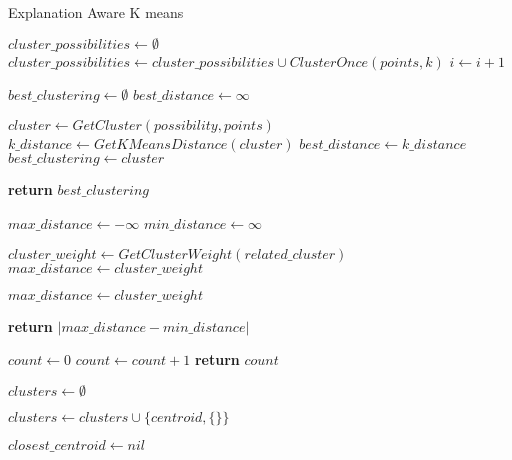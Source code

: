 \begin{algorithm}
\caption{Explanation Aware K means}\label{alg:kmeans}
\begin{algorithmic}[1]
    \State $cluster\_possibilities \gets \emptyset$
      \State $cluster\_possibilities \gets cluster\_possibilities \cup ClusterOnce(points, k)$
      \State $i \gets i + 1$
    \EndFor

    \State $best\_clustering \gets \emptyset$
    \State $best\_distance \gets \infty$

      \State $cluster \gets GetCluster(possibility, points)$
      \State $k\_distance \gets GetKMeansDistance(cluster)$
        \State $best\_distance \gets k\_distance$
        \State $best\_clustering \gets cluster$
      \EndIf
    \EndFor

    \State \textbf{return} $best\_clustering$
\EndProcedure

    \State $max\_distance \gets -\infty$
    \State $min\_distance \gets \infty$

    \end{algorithmic}
    \end{algorithm}
    \begin{algorithm}
    \begin{algorithmic} [1]
      \State $cluster\_weight \gets GetClusterWeight(related\_cluster)$
        \State $max\_distance \gets cluster\_weight$
      \EndIf

        \State $max\_distance \gets cluster\_weight$
      \EndIf
    \EndFor

    \State \textbf{return} $|max\_distance-min\_distance|$
\EndProcedure

    \State $count \gets 0$
      \State $count \gets count + 1$
    \EndFor
    \State \textbf{return} $count$
\EndProcedure

  \State $clusters \gets \emptyset$

    \State $clusters \gets clusters \cup \{centroid, \{\}\}$
  \EndFor

    \State $closest\_centroid \gets nil$
    \end{algorithmic}
    \end{algorithm}
